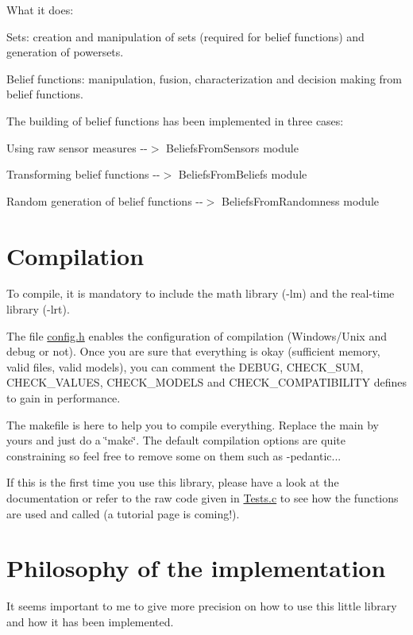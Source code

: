 What it does: \begin{DoxyItemize}
\item Sets: creation and manipulation of sets (required for belief functions) and generation of powersets. \item Belief functions: manipulation, fusion, characterization and decision making from belief functions.\end{DoxyItemize}
The building of belief functions has been implemented in three cases: \begin{DoxyItemize}
\item Using raw sensor measures -\/-\/$>$ BeliefsFromSensors module \item Transforming belief functions -\/-\/$>$ BeliefsFromBeliefs module \item Random generation of belief functions -\/-\/$>$ BeliefsFromRandomness module\end{DoxyItemize}
\hypertarget{index_compil_sec}{}\section{Compilation}\label{index_compil_sec}
To compile, it is mandatory to include the math library (-\/lm) and the real-\/time library (-\/lrt). \par


The file \hyperlink{config_8h}{config.h} enables the configuration of compilation (Windows/Unix and debug or not). Once you are sure that everything is okay (sufficient memory, valid files, valid models), you can comment the DEBUG, CHECK\_\-SUM, CHECK\_\-VALUES, CHECK\_\-MODELS and CHECK\_\-COMPATIBILITY defines to gain in performance. \par
 The makefile is here to help you to compile everything. Replace the main by yours and just do a \char`\"{}make\char`\"{}. The default compilation options are quite constraining so feel free to remove some on them such as -\/pedantic...

If this is the first time you use this library, please have a look at the documentation or refer to the raw code given in \hyperlink{_tests_8c}{Tests.c} to see how the functions are used and called (a tutorial page is coming!).\hypertarget{index_ref_philo}{}\section{Philosophy of the implementation}\label{index_ref_philo}
It seems important to me to give more precision on how to use this little library and how it has been implemented.

